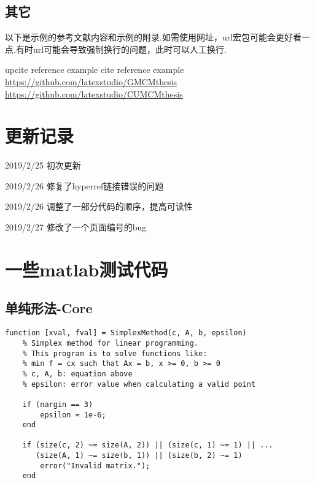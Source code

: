 \documentclass[bwprint, withouttitlepage, openfonts]{mathexpthesis}
\begin{document}
\subsection{其它}
以下是示例的参考文献内容和示例的附录.如需使用网址，url宏包可能会更好看一点.有时url可能会导致强制换行的问题，此时可以人工换行.

\begin{thebibliography}{99}
     upcite reference example
     cite reference example
     \url{https://github.com/latexstudio/GMCMthesis}
     \url{https://github.com/latexstudio/CUMCMthesis}
\end{thebibliography}

\begin{appendices}
\section{更新记录}
2019/2/25 初次更新

2019/2/26 修复了hyperref链接错误的问题

2019/2/26 调整了一部分代码的顺序，提高可读性

2019/2/27 修改了一个页面编号的bug

\section{一些matlab测试代码}
\subsection{单纯形法-Core}
\begin{verbatim}
function [xval, fval] = SimplexMethod(c, A, b, epsilon)
    % Simplex method for linear programming.
    % This program is to solve functions like:
    % min f = cx such that Ax = b, x >= 0, b >= 0
    % c, A, b: equation above
    % epsilon: error value when calculating a valid point
    
    if (nargin == 3)
        epsilon = 1e-6;
    end

    if (size(c, 2) ~= size(A, 2)) || (size(c, 1) ~= 1) || ...
       (size(A, 1) ~= size(b, 1)) || (size(b, 2) ~= 1)
        error("Invalid matrix.");
    end


\end{verbatim}
\end{appendices}
\end{document}
